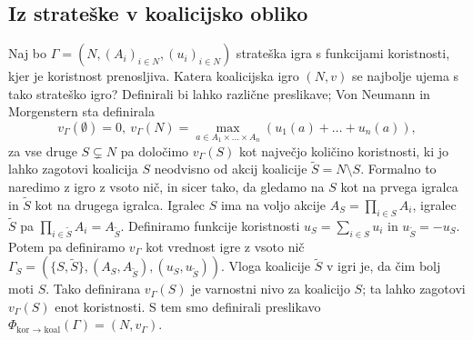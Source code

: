 \documentclass[10pt, a4paper]{article}
\begin{document}
\subsection{Iz strateške v koalicijsko obliko}

Naj bo $\Gamma = (N, (A_i)_{i \in N}, (u_i)_{i \in N})$ strateška igra s 
funkcijami koristnosti, kjer je koristnost prenosljiva.
Katera koalicijska igro $(N, v)$ se najbolje ujema s tako strateško igro?
Definirali bi lahko različne preslikave; Von Neumann in Morgenstern sta definirala 
$$v_{\Gamma}(\emptyset) = 0,\ v_{\Gamma}(N) = \max_{a \in A_1 \times \dots \times A_n} (u_1 (a) + \dots + u_n(a)),$$
za vse druge $S \subsetneq N$ pa določimo $v_{\Gamma} (S)$ kot največjo 
količino koristnosti, ki jo lahko zagotovi koalicija $S$ neodvisno od akcij koalicije $\tilde{S} = N \setminus S$.
Formalno to naredimo z igro z vsoto nič, in sicer tako,
da gledamo na $S$ kot na prvega igralca in $\tilde{S}$ kot na drugega igralca.
Igralec $S$ ima na voljo akcije $A_S = \prod_{i \in S} A_i$, igralec $\tilde{S}$ pa $\prod_{i \in \tilde{S}} A_i = A_{\tilde{S}}$. 
Definiramo funkcije koristnosti $u_S = \sum_{i \in S} u_i$ in $u_{\widetilde{S}} = -u_S$.
Potem pa definiramo $v_{\Gamma}$ kot vrednost igre z vsoto nič 
$\Gamma_S = (\{S, \tilde{S}\}, (A_S, A_{\tilde{S}}), (u_S, u_{\tilde{S}}))$.
Vloga koalicije $\tilde{S}$ v igri je, da čim bolj moti $S$.
Tako definirana $v_{\Gamma} (S)$ je varnostni nivo za koalicijo $S$; ta lahko zagotovi $v_{\Gamma} (S)$
enot koristnosti. S tem smo definirali preslikavo $\Phi_{\text{kor $\to$ koal}} (\Gamma) = (N, v_{\Gamma})$.
\end{document}
